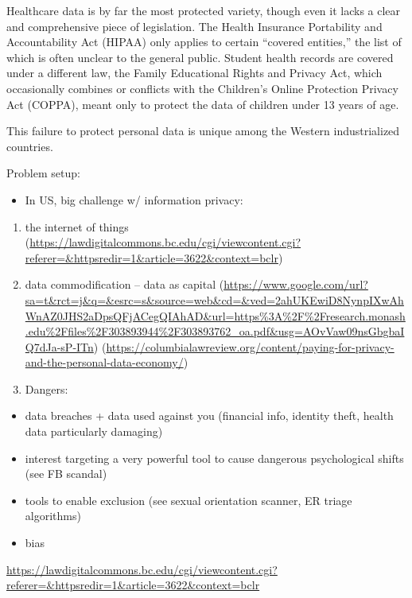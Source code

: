\documentclass[water,article,submit,moreauthors,pdftex]{mdpi}
\providecommand{\tightlist}{%
  \setlength{\itemsep}{0pt}\setlength{\parskip}{4pt}}
\begin{document}
Healthcare data is by far the most protected variety, though even it
lacks a clear and comprehensive piece of legislation. The Health
Insurance Portability and Accountability Act (HIPAA) only applies to
certain ``covered entities,'' the list of which is often unclear to the
general public. Student health records are covered under a different
law, the Family Educational Rights and Privacy Act, which occasionally
combines or conflicts with the Children's Online Protection Privacy Act
(COPPA), meant only to protect the data of children under 13 years of
age.

This failure to protect personal data is unique among the Western
industrialized countries.

Problem setup:

\begin{itemize}
\tightlist
\item
  In US, big challenge w/ information privacy:
\end{itemize}

\begin{enumerate}
\def\labelenumi{\arabic{enumi}.}
\item
  the internet of things
  (\url{https://lawdigitalcommons.bc.edu/cgi/viewcontent.cgi?referer=\&httpsredir=1\&article=3622\&context=bclr})
\item
  data commodification -- data as capital
  (\url{https://www.google.com/url?sa=t\&rct=j\&q=\&esrc=s\&source=web\&cd=\&ved=2ahUKEwiD8NynpIXwAhWnAZ0JHS2aDpsQFjACegQIAhAD\&url=https\%3A\%2F\%2Fresearch.monash.edu\%2Ffiles\%2F303893944\%2F303893762_oa.pdf\&usg=AOvVaw09nsGbgbaIQ7dJa-sP-ITn})
  (\url{https://columbialawreview.org/content/paying-for-privacy-and-the-personal-data-economy/})
\item
  Dangers:
\end{enumerate}

\begin{itemize}
\tightlist
\item
  data breaches + data used against you (financial info, identity theft,
  health data particularly damaging)
\item
  interest targeting a very powerful tool to cause dangerous
  psychological shifts (see FB scandal)
\item
  tools to enable exclusion (see sexual orientation scanner, ER triage
  algorithms)
\item
  bias
\end{itemize}

\url{https://lawdigitalcommons.bc.edu/cgi/viewcontent.cgi?referer=\&httpsredir=1\&article=3622\&context=bclr}
\end{document}

